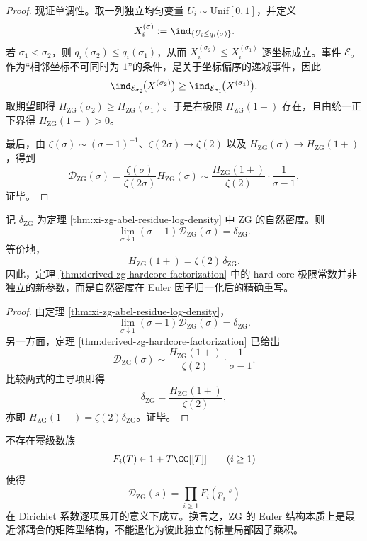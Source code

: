 \documentclass[../../../main.tex]{subfiles}
\begin{document}
\begin{proof}
现证单调性。取一列独立均匀变量 \(U_i\sim \mathrm{Unif}[0,1]\)，并定义
\[
X_i^{(\sigma)}:=\ind_{\{U_i\le q_i(\sigma)\}}.
\]
若 \(\sigma_1<\sigma_2\)，则 \(q_i(\sigma_2)\le q_i(\sigma_1)\)，从而
\(
X_i^{(\sigma_2)}\le X_i^{(\sigma_1)}
\)
逐坐标成立。事件 \(\mathcal E_{\sigma}\) 作为“相邻坐标不可同时为 \(1\)”的条件，是关于坐标偏序的递减事件，因此
\[
\ind_{\mathcal E_{\sigma_2}}\!\bigl(X^{(\sigma_2)}\bigr)
\ge
\ind_{\mathcal E_{\sigma_1}}\!\bigl(X^{(\sigma_1)}\bigr).
\]
取期望即得 \(H_{\mathrm{ZG}}(\sigma_2)\ge H_{\mathrm{ZG}}(\sigma_1)\)。于是右极限 \(H_{\mathrm{ZG}}(1+)\) 存在，且由统一正下界得 \(H_{\mathrm{ZG}}(1+)>0\)。

最后，由 \(\zeta(\sigma)\sim (\sigma-1)^{-1}\)、\(\zeta(2\sigma)\to \zeta(2)\) 以及 \(H_{\mathrm{ZG}}(\sigma)\to H_{\mathrm{ZG}}(1+)\)，得到
\[
\mathcal D_{\mathrm{ZG}}(\sigma)
=
\frac{\zeta(\sigma)}{\zeta(2\sigma)}H_{\mathrm{ZG}}(\sigma)
\sim
\frac{H_{\mathrm{ZG}}(1+)}{\zeta(2)}\cdot \frac{1}{\sigma-1},
\]
证毕。
\end{proof}

\begin{corollary}[ZG Dirichlet 级数在 \texorpdfstring{$s=1$}{s=1} 的简单极点留数等于自然密度]\label{cor:derived-zg-simple-pole-density-residue}
记 \(\delta_{\mathrm{ZG}}\) 为定理 \ref{thm:xi-zg-abel-residue-log-density} 中 \(\mathrm{ZG}\) 的自然密度。则
\[
\lim_{\sigma\downarrow 1}(\sigma-1)\mathcal D_{\mathrm{ZG}}(\sigma)=\delta_{\mathrm{ZG}}.
\]
等价地，
\[
H_{\mathrm{ZG}}(1+)=\zeta(2)\,\delta_{\mathrm{ZG}}.
\]
因此，定理 \ref{thm:derived-zg-hardcore-factorization} 中的 hard-core 极限常数并非独立的新参数，而是自然密度在 Euler 因子归一化后的精确重写。
\end{corollary}

\begin{proof}
由定理 \ref{thm:xi-zg-abel-residue-log-density}，
\[
\lim_{\sigma\downarrow 1}(\sigma-1)\mathcal D_{\mathrm{ZG}}(\sigma)=\delta_{\mathrm{ZG}}.
\]
另一方面，定理 \ref{thm:derived-zg-hardcore-factorization} 已给出
\[
\mathcal D_{\mathrm{ZG}}(\sigma)\sim
\frac{H_{\mathrm{ZG}}(1+)}{\zeta(2)}\cdot \frac{1}{\sigma-1}.
\]
比较两式的主导项即得
\[
\delta_{\mathrm{ZG}}=\frac{H_{\mathrm{ZG}}(1+)}{\zeta(2)},
\]
亦即 \(H_{\mathrm{ZG}}(1+)=\zeta(2)\delta_{\mathrm{ZG}}\)。证毕。
\end{proof}

\begin{theorem}\label{thm:derived-zg-no-scalar-euler-product}
不存在幂级数族
\[
F_i(T)\in 1+T\CC[[T]]
\qquad (i\ge 1)
\]
使得
\[
\mathcal D_{\mathrm{ZG}}(s)=\prod_{i\ge 1}F_i(p_i^{-s})
\]
在 Dirichlet 系数逐项展开的意义下成立。换言之，\(\mathrm{ZG}\) 的 Euler 结构本质上是最近邻耦合的矩阵型结构，不能退化为彼此独立的标量局部因子乘积。
\end{theorem}
\end{document}
